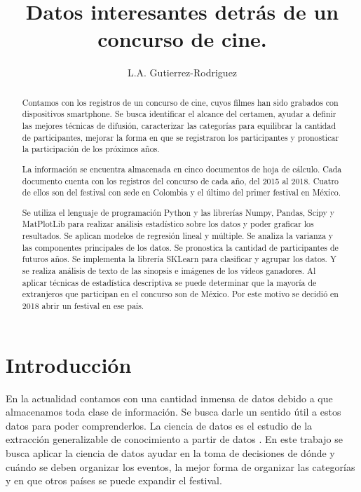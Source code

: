\documentclass[5p,times]{elsarticle}
\begin{document}
\begin{frontmatter}

\title{Datos interesantes detrás de un concurso de cine.}
\author{L.A. Gutierrez-Rodriguez}
\address{Posgrado de Ingeniería en Sistemas,\\ Facultad de Ingeniería Mecánica y Eléctrica,\\ Universidad Autónoma de Nuevo León}

\begin{abstract}
Contamos con los registros de un concurso de cine, cuyos filmes han sido grabados con dispositivos smartphone. Se busca identificar el alcance del certamen, ayudar a definir las mejores técnicas de difusión, caracterizar las categorías para equilibrar la cantidad de participantes, mejorar la forma en que se registraron los participantes y pronosticar la participación de los próximos años. 

La información se encuentra almacenada en cinco documentos de hoja de cálculo. Cada documento cuenta con los registros del concurso de cada año, del 2015 al 2018. Cuatro de ellos son del festival con sede en Colombia y el último del primer festival en México.

Se utiliza el lenguaje de programación Python y las librerías Numpy, Pandas, Scipy y MatPlotLib para realizar análisis estadístico sobre los datos y poder graficar los resultados. Se aplican modelos de regresión lineal y múltiple. Se analiza la varianza y las componentes principales de los datos. Se pronostica la cantidad de participantes de futuros años. Se implementa la librería SKLearn para clasificar y agrupar los datos. Y se realiza análisis de texto de las sinopsis e imágenes de los vídeos ganadores. Al aplicar técnicas de estadística descriptiva se puede determinar que la mayoría de extranjeros que participan en el concurso son de México. Por este motivo se decidió en 2018 abrir un festival en ese país. 




\end{abstract}

\end{frontmatter}




\section*{Introducción}
En la actualidad contamos con una cantidad inmensa de datos debido a que almacenamos toda clase de información. Se busca darle un sentido útil a estos datos para poder comprenderlos. La ciencia de datos es el estudio de la extracción generalizable de conocimiento a partir de datos \cite{dhar2012data}. En este trabajo se busca aplicar la ciencia de datos ayudar en la toma de decisiones de dónde y cuándo se deben organizar los eventos, la mejor forma de organizar las categorías y en que otros países se puede expandir el festival. 
\end{document}
